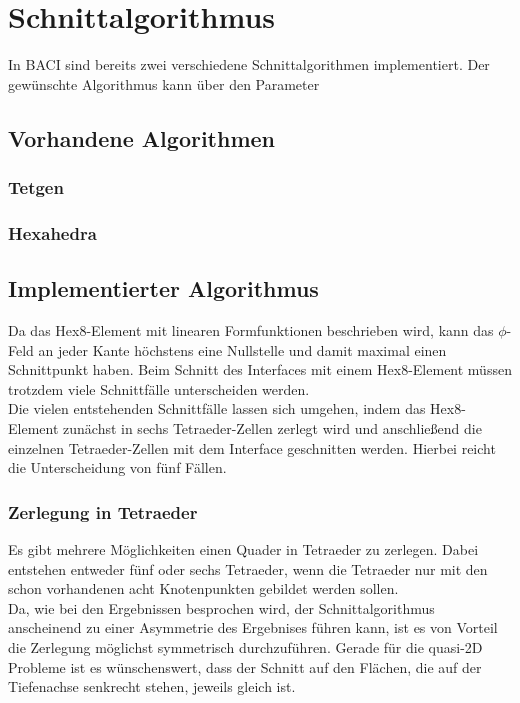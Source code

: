 
\chapter{Schnittalgorithmus}

In BACI sind bereits zwei verschiedene Schnittalgorithmen implementiert. Der
gewünschte Algorithmus kann über den Parameter 

\section{Vorhandene Algorithmen}
\subsection{Tetgen}
\subsection{Hexahedra}

\section{Implementierter Algorithmus}
Da das Hex8-Element mit linearen Formfunktionen beschrieben
wird, kann das $\phi$-Feld an jeder Kante höchstens eine Nullstelle und
damit maximal einen Schnittpunkt haben.
Beim Schnitt des Interfaces mit einem Hex8-Element müssen trotzdem viele
Schnittfälle unterscheiden werden. \\

Die vielen entstehenden Schnittfälle lassen sich umgehen, indem das Hex8-Element zunächst in sechs Tetraeder-Zellen zerlegt wird und anschließend die einzelnen Tetraeder-Zellen mit dem Interface geschnitten werden. Hierbei reicht die Unterscheidung von fünf Fällen.

\subsection{Zerlegung in Tetraeder}
Es gibt mehrere Möglichkeiten einen Quader in Tetraeder zu zerlegen. Dabei entstehen entweder fünf oder sechs Tetraeder, wenn die Tetraeder nur mit den schon vorhandenen acht Knotenpunkten gebildet werden sollen.\\

Da, wie bei den Ergebnissen besprochen wird, der Schnittalgorithmus anscheinend zu einer Asymmetrie des Ergebnises führen kann, ist es von Vorteil die Zerlegung möglichst symmetrisch durchzuführen. Gerade für die quasi-2D Probleme ist es wünschenswert, dass der Schnitt auf den Flächen, die auf der Tiefenachse senkrecht stehen, jeweils gleich ist.\\

